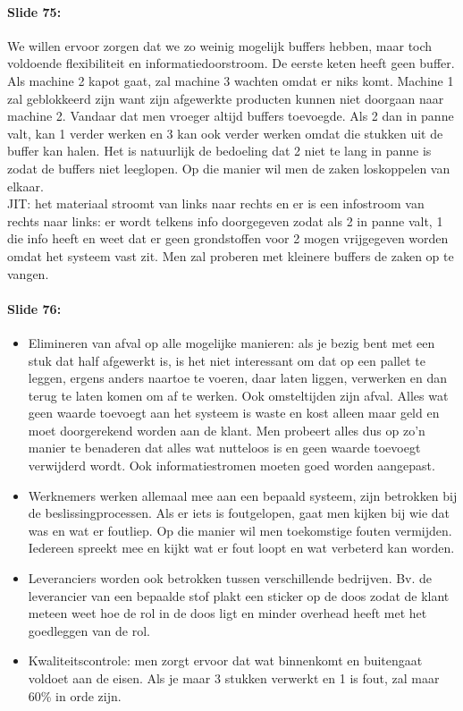 \documentclass[10pt,a4paper]{report}
\begin{document}
\paragraph{Slide 75:} We willen ervoor zorgen dat we zo weinig mogelijk buffers hebben, maar toch voldoende flexibiliteit en informatiedoorstroom. De eerste keten heeft geen buffer. Als machine 2 kapot gaat, zal machine 3 wachten omdat er niks komt. Machine 1 zal geblokkeerd zijn want zijn afgewerkte producten kunnen niet doorgaan naar machine 2. Vandaar dat men vroeger altijd buffers toevoegde. Als 2 dan in panne valt, kan 1 verder werken en 3 kan ook verder werken omdat die stukken uit de buffer kan halen. Het is natuurlijk de bedoeling dat 2 niet te lang in panne is zodat de buffers niet leeglopen. Op die manier wil men de zaken loskoppelen van elkaar.\\
JIT: het materiaal stroomt van links naar rechts en er is een infostroom van rechts naar links: er wordt telkens info doorgegeven zodat als 2 in panne valt, 1 die info heeft en weet dat er geen grondstoffen voor 2 mogen vrijgegeven worden omdat het systeem vast zit. Men zal proberen met kleinere buffers de zaken op te vangen.

\paragraph{Slide 76:}
\begin{itemize}
\item Elimineren van afval op alle mogelijke manieren: als je bezig bent met een stuk dat half afgewerkt is, is het niet interessant om dat op een pallet te leggen, ergens anders naartoe te voeren, daar laten liggen, verwerken en dan terug te laten komen om af te werken. Ook omsteltijden zijn afval. Alles wat geen waarde toevoegt aan het systeem is waste en kost alleen maar geld en moet doorgerekend worden aan de klant. Men probeert alles dus op zo'n manier te benaderen dat alles wat nutteloos is en geen waarde toevoegt verwijderd wordt. Ook informatiestromen moeten goed worden aangepast.
\item Werknemers werken allemaal mee aan een bepaald systeem, zijn betrokken bij de beslissingprocessen. Als er iets is foutgelopen, gaat men kijken bij wie dat was en wat er foutliep. Op die manier wil men toekomstige fouten vermijden. Iedereen spreekt mee en kijkt wat er fout loopt en wat verbeterd kan worden. 
\item Leveranciers worden ook betrokken tussen verschillende bedrijven. Bv. de leverancier van een bepaalde stof plakt een sticker op de doos zodat de klant meteen weet hoe de rol in de doos ligt en minder overhead heeft met het goedleggen van de rol.
\item Kwaliteitscontrole: men zorgt ervoor dat wat binnenkomt en buitengaat voldoet aan de eisen. Als je maar 3 stukken verwerkt en 1 is fout, zal maar 60\% in orde zijn.
\end{itemize} 
\end{document}
